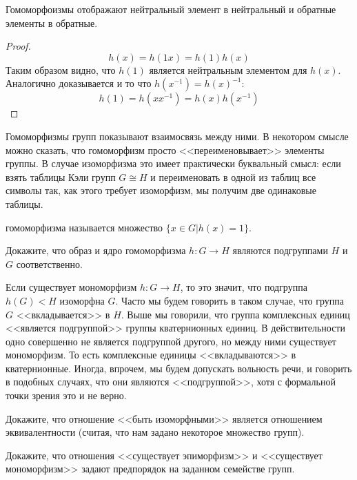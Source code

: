 \begin{thm}
	Гомоморфоизмы отображают нейтральный элемент в нейтральный и обратные элементы в обратные.
\end{thm}
\begin{proof}
	\[
	h(x) = h(1x) = h(1)h(x)
	\]
	Таким образом видно, что $h(1)$ является нейтральным элементом для $h(x)$. Аналогично доказывается и то что $h(x^{-1})=h(x)^{-1}$:
	\[
	h(1) = h(xx^{-1}) = h(x)h(x^{-1})
	\]
\end{proof}

Гомоморфизмы групп показывают взаимосвязь между ними. В некотором смысле можно сказать, что гомоморфизм просто <<переименовывает>> элементы группы. В случае изоморфизма это имеет практически буквальный смысл: если взять таблицы Кэли групп $G\cong H$ и переименовать в одной из таблиц все символы так, как этого требует изоморфизм, мы получим две одинаковые таблицы.

\begin{definition}
	 гомоморфизма называется множество $\{x\in G|h(x) = 1\}$.
\end{definition}

\begin{exercise}
	Докажите, что образ и ядро гомоморфизма $h:G\to H$ являются подгруппами $H$ и $G$ соответственно.
\end{exercise}

Если существует мономорфизм $h:G\to H$, то это значит, что подгруппа $h(G)<H$ изоморфна $G$. Часто мы будем говорить в таком случае, что группа $G$ <<вкладывается>> в $H$. Выше мы говорили, что группа комплексных единиц <<является подгруппой>> группы кватернионных единиц. В действительности одно совершенно не является подгруппой другого, но между ними существует мономорфизм. То есть комплексные единицы <<вкладываются>> в кватернионные. Иногда, впрочем, мы будем допускать вольность речи, и говорить в подобных случаях, что они являются <<подгруппой>>, хотя с формальной точки зрения это и не верно.

\begin{exercise}
	Докажите, что отношение <<быть изоморфными>> является отношением эквивалентности (считая, что нам задано некоторое множество групп).
\end{exercise}

\begin{exercise}
	Докажите, что отношения <<существует эпиморфизм>> и <<существует мономорфизм>> задают предпорядок на заданном семействе групп.
\end{exercise}

